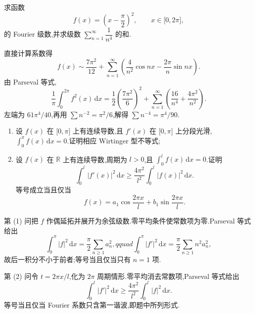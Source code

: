 \begin{example}
    求函数
    \[
        f(x)=\left(x-\dfrac{\pi}{2}\right)^2,
        \qquad x\in\lbrack 0,2\pi\rbrack,
    \]
    的 Fourier 级数,并求级数 $\displaystyle\sum\limits_{n=1}^{\infty}\dfrac{1}{n^4}$ 的和.
\end{example}
\exampleblank

\begin{solution}
    直接计算系数得
    \[
        f(x)\sim\dfrac{7\pi^2}{12}+
        \sum\limits_{n=1}^{\infty}\left(\dfrac{4}{n^2}\cos nx-\dfrac{2\pi}{n}\sin nx\right).
    \]
    由 Parseval 等式,
    \[
        \dfrac{1}{\pi}\int_0^{2\pi}f^2(x)\,\mathrm{d}x
        =\dfrac{1}{2}\left(\dfrac{7\pi^2}{6}\right)^2
        +\sum\limits_{n=1}^{\infty}\left(\dfrac{16}{n^4}+\dfrac{4\pi^2}{n^2}\right).
    \]
    左端为 $61\pi^4/40$,再用 $\displaystyle\sum n^{-2}=\pi^2/6$,解得
    $\displaystyle\sum n^{-4}=\pi^4/90$.
\end{solution}

\begin{example}
    \begin{enumerate}
        \item 设 $f(x)$ 在 $\lbrack 0,\pi\rbrack$ 上有连续导数,且 $f'(x)$ 在 $\lbrack 0,\pi\rbrack$ 上分段光滑,$\displaystyle\int_0^\pi f(x)\,\mathrm{d}x=0$.证明相应 Wirtinger 型不等式;
        \item 设 $f(x)$ 在 $\mathbb{R}$ 上有连续导数,周期为 $l>0$,且 $\displaystyle\int_0^lf(x)\,\mathrm{d}x=0$.证明
              \[
                  \displaystyle\int_0^l|f'(x)|^2\,\mathrm{d}x
                  \geq\dfrac{4\pi^2}{l^2}\int_0^l|f(x)|^2\,\mathrm{d}x.
              \]
              等号成立当且仅当
              \[
                  f(x)=a_1\cos\dfrac{2\pi x}{l}+b_1\sin\dfrac{2\pi x}{l}.
              \]
    \end{enumerate}
\end{example}
\exampleblank

\begin{solution}
    第 (1) 问把 $f$ 作偶延拓并展开为余弦级数.零平均条件使常数项为零.Parseval 等式给出
    \[
        \displaystyle\int_0^\pi|f|^2\,\mathrm{d}x=\dfrac{\pi}{2}\sum\limits_{n\geq1}a_n^2,qquad
        \int_0^\pi|f'|^2\,\mathrm{d}x=\dfrac{\pi}{2}\sum\limits_{n\geq1}n^2a_n^2,
    \]
    故后一积分不小于前者;等号当且仅当只有 $n=1$ 项.

    第 (2) 问令 $t=2\pi x/l$,化为 $2\pi$ 周期情形.零平均消去常数项,Parseval 等式给出
    \[
        \displaystyle\int_0^l|f'|^2\,\mathrm{d}x\geq\dfrac{4\pi^2}{l^2}
        \int_0^l|f|^2\,\mathrm{d}x.
    \]
    等号当且仅当 Fourier 系数只含第一谐波,即题中所列形式.
\end{solution}
